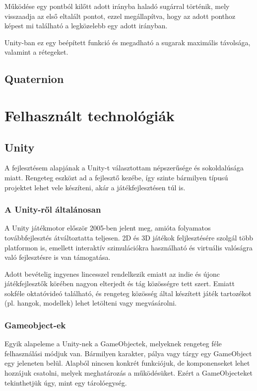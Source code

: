 \documentclass[
]{thesis-ekf}
\theoremstyle{definition}
\theoremstyle{remark}
\begin{document}
Működése egy pontból kilőtt adott irányba haladó sugárral történik, mely visszaadja az első eltalált pontot, ezzel megállapítva, hogy az adott ponthoz képest mi található a legközelebb egy adott irányban.

Unity-ban ez egy beépített funkció és megadható a sugarak maximális távolsága, valamint a rétegeket.

\section{Quaternion}

\chapter{Felhasznált technológiák}

\section{Unity}

A fejlesztésem alapjának a Unity-t választottam népszerűsége és sokoldalúsága miatt. Rengeteg eszközt ad a fejlesztő kezébe, így szinte bármilyen típusú projektet lehet vele készíteni, akár a játékfejlesztésen túl is.

\subsection{A Unity-ről általánosan}

A Unity játékmotor először 2005-ben jelent meg, amióta folyamatos továbbfejlesztés átváltoztatta teljesen. 2D és 3D játékok feljlesztésére szolgál több platformon is, emellett interaktív szimulációkra használható és virtuális valóságra való fejlesztésre is van támogatása.

Adott bevételig ingyenes lincesszel rendelkezik emiatt az indie és újonc játékfejlesztők körében nagyon elterjedt és tág közösségre tett szert. Emiatt sokféle oktatóvideó található, és rengeteg közösség által készített játék tartozékot (pl. hangok, modellek) lehet letölteni vagy megvásárolni.

\subsection{Gameobject-ek}

Egyik alapeleme a Unity-nek a GameObjectek, melyeknek rengeteg féle felhasználási módjuk van. Bármilyen karakter, pálya vagy tárgy egy GameObject egy jeleneten belül. Alapból nincsen konkrét funkciójuk, de komponenseket lehet hozzájuk csatolni, melyek meghatározás a működésüket. Ezért a GameObjecteket tekinthetjük úgy, mint egy tárolóegység.
\end{document}

